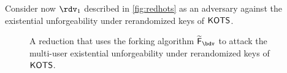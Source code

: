   Consider now $\rdv_1$ described in \autoref{fig:redhots} as an adversary against the existential unforgeability under rerandomized keys of $\mathsf{KOTS}$.
  \begin{figure}\centering
  \caption{A reduction that uses the forking algorithm $\widetilde\fork_\bdv$ to attack the multi-user existential unforgeability under rerandomized keys of $\mathsf{KOTS}$.}\label{fig:redhots}
  \end{figure}
